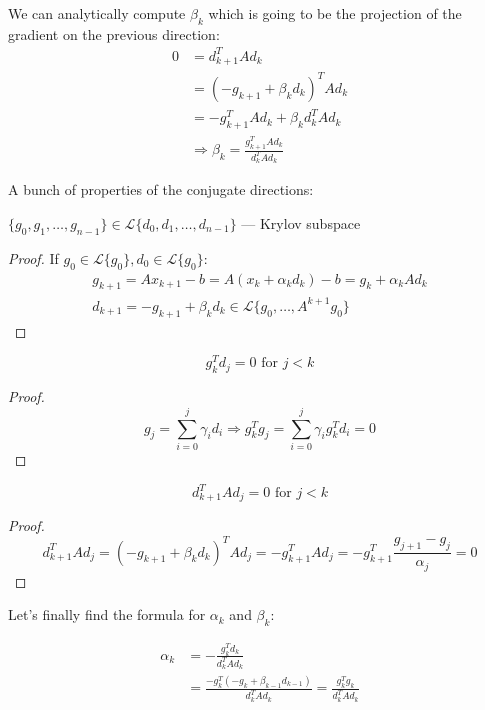 We can analytically compute $\beta_k$ which is going to be the projection of the gradient on the previous direction:
\begin{align*}
    0 &= d^T_{k+1} A d_k \\ 
    &= (-g_{k+1} + \beta_k d_k)^T A d_k \\ 
    &= -g_{k+1}^T A d_k + \beta_k d_k^T A d_k \\
    &\Longrightarrow \beta_k = \frac{g_{k+1}^T A d_k}{d_k^T A d_k}
\end{align*}

A bunch of properties of the conjugate directions:

\begin{theorem}
    $\{g_0, g_1, \ldots, g_{n-1}\} \in \mathcal{L} \{ d_0, d_1, \ldots, d_{n-1} \}$ --- Krylov subspace
\end{theorem}
\begin{proof}
    If $g_0 \in \mathcal{L} \{g_0\}, d_0 \in \mathcal{L} \{g_0\}$: 
    \begin{gather*}
        g_{k+1} = A x_{k+1} - b = A (x_k + \alpha_k d_k) - b = g_k + \alpha_k A d_k \\ 
        d_{k+1} = -g_{k+1} + \beta_k d_k \in \mathcal{L} \{ g_0, \ldots, A^{k+1} g_0 \}
    \end{gather*}
\end{proof}

\begin{theorem}
    \[
        g_k^T d_j = 0 \text{ for } j < k
    \]
\end{theorem}
\begin{proof}
    \[ 
        g_j = \sum^{j}_{i=0} \gamma_i d_i \Longrightarrow g_k^T g_j = \sum^{j}_{i=0} \gamma_i g_k^T d_i = 0
    \]
\end{proof}

\begin{theorem}
    \[
        d_{k+1}^T A d_j = 0 \text{ for } j < k
    \]
\end{theorem}
\begin{proof}
    \[ 
        d_{k+1}^T A d_j = (-g_{k+1} + \beta_k d_k)^T A d_j = -g_{k+1}^T A d_j = -g_{k+1}^T \frac{g_{j+1} - g_j}{\alpha_j} = 0
    \]
\end{proof}

Let's finally find the formula for $\alpha_k$ and $\beta_k$: 

\begin{align*}
    \alpha_k &= - \frac{g_k^T d_k}{d_k^T A d_k} \\ 
    &= \frac{-g_k^T (-g_k + \beta_{k-1} d_{k-1})}{d_k^T A d_k}
    = \boxed{\frac{g_k^T g_k}{d_k^T A d_k}} \\ 
\end{align*}

